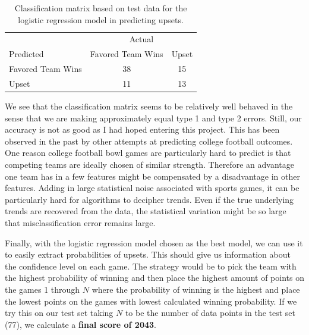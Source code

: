 \documentclass[12pt]{article}
\begin{document}
\begin{table}[ht!]
	\begin{center}
		\caption{Classification matrix based on test data for the logistic regression model in predicting upsets.}
		\label{tab::class_matrix}
		\begin{tabular}{l|cc}
			& \multicolumn{2}{c}{Actual} \\
			Predicted & Favored Team Wins & Upset \\
			\hline
			Favored Team Wins & 38 & 15\\
			Upset & 11 & 13\\
		\end{tabular}
	\end{center}
\end{table}

We see that the classification matrix seems to be relatively well behaved in the sense that we are making approximately equal type 1 and type 2 errors. Still, our accuracy is not as good as I had hoped entering this project. This has been observed in the past by other attempts \cite{Liu,Hamann} at predicting college football outcomes. One reason college football bowl games are particularly hard to predict is that competing teams are ideally chosen of similar strength. Therefore an advantage one team has in a few features might be compensated by a disadvantage in other features. Adding in large statistical noise associated with sports games, it can be particularly hard for algorithms to decipher trends. Even if the true underlying trends are recovered from the data, the statistical variation might be so large that misclassification error remains large.

Finally, with the logistic regression model chosen as the best model, we can use it to easily extract probabilities of upsets. This should give us information about the confidence level on each game. The strategy would be to pick the team with the highest probability of winning and then place the highest amount of points on the games 1 through $N$ where the probability of winning is the highest and place the lowest points on the games with lowest calculated winning probability. If we try this on our test set taking $N$ to be the number of data points in the test set (77), we calculate a \textbf{final score of 2043}.
\end{document}
